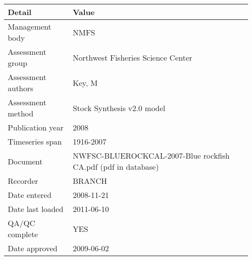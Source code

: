 \begin{table}[htb]
\centering
\begin{tabular}{lp{7cm}}
\toprule
Detail & Value \\
\midrule
Management body    & NMFS                                                          \\
Assessment group   & Northwest Fisheries Science Center                            \\
Assessment authors & Key, M                                                        \\
Assessment method  & Stock Synthesis v2.0 model                                    \\
Publication year   & 2008                                                          \\
Timeseries span    & 1916-2007                                                     \\
Document           & NWFSC-BLUEROCKCAL-2007-Blue rockfish CA.pdf (pdf in database) \\
Recorder           & BRANCH                                                        \\
Date entered       & 2008-11-21                                                    \\
Date last loaded   & 2011-06-10                                                    \\
QA/QC complete     & YES                                                           \\
Date approved      & 2009-06-02                                                    \\
\bottomrule
\end{tabular}
\label{tab:assessdet}
\end{table}
